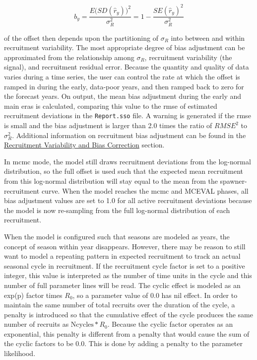 \begin{equation}
	b_y=\frac{E\Big( SD(\hat{r}_y)\Big)^2}{\sigma^2_R}=1-\frac{SE(\hat{r}_y)^2}{\sigma^2_R}
\end{equation}

\noindent of the offset then depends upon the partitioning of $\sigma_R$ into between and within recruitment variability. The most appropriate degree of bias adjustment can be approximated from the relationship among $\sigma_R$, recruitment variability (the signal), and recruitment residual error. Because the quantity and quality of data varies during a time series, the user can control the rate at which the offset is ramped in during the early, data-poor years, and then ramped back to zero for the forecast years. On output, the mean bias adjustment during the early and main eras is calculated, comparing this value to the \gls{rmse} of estimated recruitment deviations in the \texttt{Report.sso} file. A warning is generated if the \gls{rmse} is small and the bias adjustment is larger than 2.0 times the ratio of $RMSE^2$ to $\sigma^2_R$. Additional information on recruitment bias adjustment can be found in the \hyperlink{BiasCorrect}{Recruitment Variability and Bias Correction} section.

In \gls{mcmc} mode, the model still draws recruitment deviations from the log-normal distribution, so the full offset is used such that the expected mean recruitment from this log-normal distribution will stay equal to the mean from the spawner-recruitment curve. When the model reaches the \gls{mcmc} and MCEVAL phases, all bias adjustment values are set to 1.0 for all active recruitment deviations because the model is now re-sampling from the full log-normal distribution of each recruitment.

When the model is configured such that seasons are modeled as years, the concept of season within year disappears. However, there may be reason to still want to model a repeating pattern in expected recruitment to track an actual seasonal cycle in recruitment. If the recruitment cycle factor is set to a positive integer, this value is interpreted as the number of time units in the cycle and this number of full parameter lines will be read. The cyclic effect is modeled as an exp(p) factor times $R_{0}$, so a parameter value of 0.0 has nil effect. In order to maintain the same number of total recruits over the duration of the cycle, a penalty is introduced so that the cumulative effect of the cycle produces the same number of recruits as $\text{Ncycles}*R_{0}$. Because the cyclic factor operates as an exponential, this penalty is different from a penalty that would cause the sum of the cyclic factors to be 0.0. This is done by adding a penalty to the parameter likelihood.

